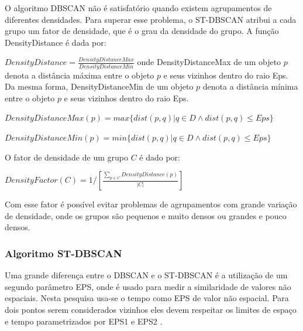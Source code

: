 O algoritmo DBSCAN não é satisfatório quando existem agrupamentos de diferentes densidades. Para superar esse problema,  o ST-DBSCAN atribui a cada grupo um fator de densidade, que é o grau da densidade do grupo.
A função DensityDistance é dada por:

${DensityDistance = \frac{DensityDistanceMax}{DensityDistanceMin}}$
\linebreak
onde DensityDistanceMax de um objeto ${p}$ denota a distância máxima entre o objeto ${p}$ e seus vizinhos dentro do raio Eps. Da mesma forma, DensityDistanceMin de um objeto ${p}$ denota a distância mínima entre o objeto ${p}$ e seus vizinhos dentro do raio Eps.

${DensityDistanceMax(p) = max\big\{ dist(p, q) | q \in D \wedge dist(p, q)  \leqslant Eps\big\} }$

${DensityDistanceMin(p) = min\big\{ dist(p, q) | q \in D \wedge dist(p, q)  \leqslant Eps\big\} }$
\linebreak

O fator de densidade de um grupo ${C}$ é dado por:

${DensityFactor(C) = 1\big/\left [   \frac{\sum_{p\in C}DensityDistance(p)}{|C|} \right ]}$
\linebreak

Com esse fator é possível evitar problemas de agrupamentos com grande variação de densidade, onde os grupos são pequenos e muito densos ou grandes e pouco densos.

\subsubsection{Algoritmo ST-DBSCAN}
Uma grande diferença entre o DBSCAN e o ST-DBSCAN é a utilização de um segundo parâmetro EPS, onde é usado para medir a similaridade de valores não espaciais. Nesta pesquisa usa-se o tempo como EPS de valor não espacial. Para dois pontos serem considerados vizinhos eles devem respeitar os limites de espaço e tempo parametrizados por EPS1 e EPS2 \cite{Birant2007STDBSCANAA}.

